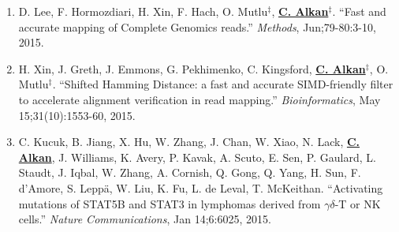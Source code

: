 \begin{enumerate}[i)]
\begin{enumerate}
  \item        
  D. Lee, F. Hormozdiari, H. Xin, F. Hach, O. Mutlu$^\ddag$,  {\bf {\underline {C. Alkan}}}$^\ddag$.
  ``Fast and accurate mapping of Complete Genomics reads.''
  {\em Methods}, Jun;79-80:3-10, 2015. 

  \item        
 H. Xin, J. Greth, J. Emmons, G. Pekhimenko, C. Kingsford, {\bf {\underline{C. Alkan}}}$^\ddag$,  O. Mutlu$^\ddag$. 
 ``Shifted Hamming Distance: a fast and accurate SIMD-friendly filter to accelerate alignment verification in read mapping.''
{\em Bioinformatics},  May 15;31(10):1553-60, 2015.

  \item        
   C. Kucuk, B. Jiang, X. Hu, W. Zhang, J. Chan, W. Xiao, N. Lack,   {\bf {\underline {C. Alkan}}},  J. Williams, K. Avery, P. Kavak, A. Scuto, E. Sen,  P. Gaulard, L. Staudt, J. Iqbal,  W. Zhang,  A. Cornish, Q. Gong, Q.  Yang, H. Sun, F. d'Amore, S. Leppä, W. Liu, K. Fu, L. de Leval, T. McKeithan.
   ``Activating mutations of STAT5B and STAT3 in lymphomas derived from $\gamma\delta$-T or NK cells.''
 {\em Nature Communications}, Jan 14;6:6025, 2015.


\end{enumerate}


\end{enumerate}

